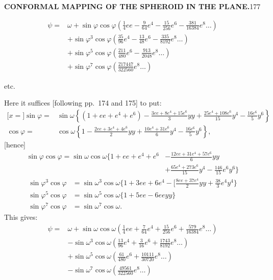 \par\clearpage
\noindent\null\hfill{\small\textbf{CONFORMAL MAPPING OF THE SPHEROID IN THE PLANE.}}\hfill177\par\medskip
\[
\begin{aligned}
\psi={}&\omega+\sin\varphi\cos\varphi(\tfrac14ee-\tfrac9{64}e^4-\tfrac{15}{256}e^6-\tfrac{381}{16384}e^8\ldots)\\
&+\sin\varphi^3\cos\varphi(\tfrac{35}{96}e^4-\tfrac{13}{48}e^6-\tfrac{335}{8192}e^8\ldots)\\
&+\sin\varphi^5\cos\varphi(\tfrac{211}{480}e^6-\tfrac{913}{2048}e^8\ldots)\\
&+\sin\varphi^7\cos\varphi(\tfrac{217447}{322560}e^8\ldots)
\end{aligned}
\]
{\centering etc.\par}
Here it suffices [following pp.~174 and 175] to put:
\[
\begin{aligned}
\mathopen{[}x={}]\sin\varphi={}&\sin\omega\left\{(1+ee+e^4+e^6)-\frac{3ee+8e^4+15e^6}{3}yy+\frac{25e^4+108e^6}{15}y^4-\frac{16e^6}{5}y^6\right\}\\
\cos\varphi={}&\cos\omega\left\{1-\frac{2ee+3e^4+4e^6}{2}yy+\frac{10e^4+31e^6}{6}y^4-\frac{16e^6}{5}y^6\right\},
\end{aligned}
\]
[hence]
\[
\begin{aligned}
\sin\varphi\cos\varphi=\sin\omega\cos\omega\biggl\{1+ee+e^4+e^6&-\frac{12ee+31e^4+57e^6}{6}yy\\
&+\frac{65e^4+273e^6}{15}y^4-\frac{146}{15}e^6y^6\biggr\}
\end{aligned}
\]
\[
\begin{aligned}
\sin\varphi^3\cos\varphi&=\sin\omega^3\cos\omega\biggl\{1+3ee+6e^4-\biggl[\frac{8ee+37e^4}{2}yy+\frac{38}{3}e^4y^4\biggr\}\\
\sin\varphi^5\cos\varphi&=\sin\omega^5\cos\omega\{1+5ee-6eeyy\}\\
\sin\varphi^7\cos\varphi&=\sin\omega^7\cos\omega.
\end{aligned}
\]
This gives:
\[
\begin{aligned}
\psi={}&\omega+\sin\omega\cos\omega(\tfrac14ee+\tfrac7{64}e^4+\tfrac{15}{256}e^6+\tfrac{579}{16384}e^8\ldots)\\
&-\sin\omega^3\cos\omega(\tfrac{13}{96}e^4+\tfrac3{16}e^6+\tfrac{1743}{8192}e^8\ldots)\\
&+\sin\omega^5\cos\omega(\tfrac{61}{480}e^6+\tfrac{10111}{30720}e^8\ldots)\\
&-\sin\omega^7\cos\omega(\tfrac{49561}{322560}e^8\ldots)
\end{aligned}
\]
